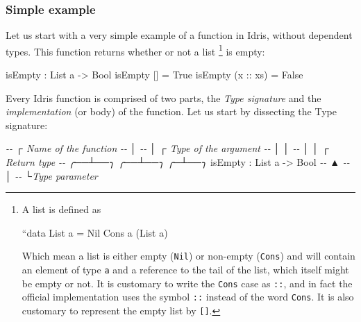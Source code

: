 \documentclass[
]{article}
\newenvironment{Shaded}{}{}
\newcommand{\CommentTok}[1]{\textcolor[rgb]{0.38,0.63,0.69}{\textit{#1}}}
\newcommand{\DataTypeTok}[1]{\textcolor[rgb]{0.56,0.13,0.00}{#1}}
\newcommand{\NormalTok}[1]{#1}
\newcommand{\OperatorTok}[1]{\textcolor[rgb]{0.40,0.40,0.40}{#1}}
\newcommand{\OtherTok}[1]{\textcolor[rgb]{0.00,0.44,0.13}{#1}}
\begin{document}
\hypertarget{simple-example}{%
\subsubsection{Simple example}\label{simple-example}}

Let us start with a very simple example of a function in Idris, without
dependent types. This function returns whether or not a list \footnote{A
  list is defined as

  ``data List a = Nil \textbar{} Cons a (List a)

  Which mean a list is either empty (\texttt{Nil}) or non-empty
  (\texttt{Cons}) and will contain an element of type \texttt{a} and a
  reference to the tail of the list, which itself might be empty or not.
  It is customary to write the \texttt{Cons} case as \texttt{::}, and in
  fact the official implementation uses the symbol \texttt{::} instead
  of the word \texttt{Cons}. It is also customary to represent the empty
  list by \texttt{{[}{]}}.} is empty:

\begin{Shaded}
\begin{Highlighting}[]
\NormalTok{isEmpty }\OperatorTok{:} \DataTypeTok{List}\NormalTok{ a }\OtherTok{{-}\textgreater{}} \DataTypeTok{Bool}
\NormalTok{isEmpty [] }\OtherTok{=} \DataTypeTok{True}
\NormalTok{isEmpty (}\OtherTok{x ::}\NormalTok{ xs) }\OtherTok{=} \DataTypeTok{False}
\end{Highlighting}
\end{Shaded}

Every Idris function is comprised of two parts, the \emph{Type
signature} and the \emph{implementation} (or body) of the function. Let
us start by dissecting the Type signature:

\begin{Shaded}
\begin{Highlighting}[]
\CommentTok{{-}{-}    ┌ Name of the function}
\CommentTok{{-}{-}    │ }
\CommentTok{{-}{-}    │         ┌ Type of the argument }
\CommentTok{{-}{-}    │         │ }
\CommentTok{{-}{-}    │         │       ┌ Return type            }
\CommentTok{{-}{-} ╭──┴──╮   ╭──┴──╮  ╭─┴──╮}
\NormalTok{   isEmpty }\OperatorTok{:} \DataTypeTok{List}\NormalTok{ a }\OtherTok{{-}\textgreater{}} \DataTypeTok{Bool}
\CommentTok{{-}{-}                ▲}
\CommentTok{{-}{-}                │ }
\CommentTok{{-}{-}                └Type parameter}
\end{Highlighting}
\end{Shaded}
\end{document}
